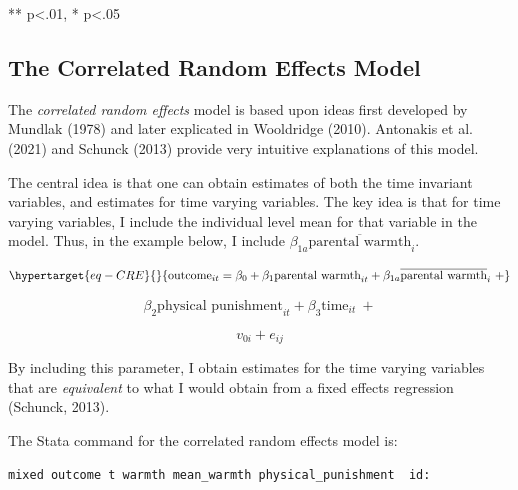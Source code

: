 \documentclass[
  letterpaper,
  DIV=11,
  numbers=noendperiod]{scrreprt}
\begin{document}
** p\textless.01, * p\textless.05

\hypertarget{the-correlated-random-effects-model}{%
\subsection{The Correlated Random Effects
Model}\label{the-correlated-random-effects-model}}

The \emph{correlated random effects} model is based upon ideas first
developed by Mundlak (1978) and later explicated in Wooldridge (2010).
Antonakis et al. (2021) and Schunck (2013) provide very intuitive
explanations of this model.

The central idea is that one can obtain estimates of both the time
invariant variables, and estimates for time varying variables. The key
idea is that for time varying variables, I include the individual level
mean for that variable in the model. Thus, in the example below, I
include \(\beta_{1a}\overline{\text{parental warmth}}_{i}\).

\begin{equation}\protect\hypertarget{eq-CRE}{}{\text{outcome}_{it} = \beta_0 + \beta_1 \text{parental warmth}_{it} + \beta_{1a}\overline{\text{parental warmth}}_{i} \ + }\label{eq-CRE}\end{equation}

\[\beta_2 \text{physical punishment}_{it} + \beta_3 \text{time}_{it} \ + \]

\[v_{0i} + e_{ij}\]

By including this parameter, I obtain estimates for the time varying
variables that are \emph{equivalent} to what I would obtain from a fixed
effects regression (Schunck, 2013).

The Stata command for the correlated random effects model is:

\texttt{mixed\ outcome\ t\ warmth\ mean\_warmth\ physical\_punishment\ \textbar{}\textbar{}\ id:}
\end{document}
